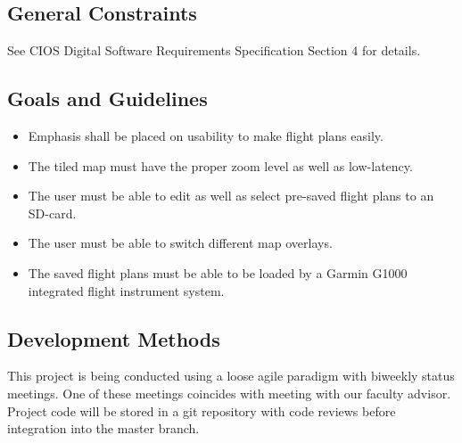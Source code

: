 \documentclass[12pt, letterpaper]{article}
\begin{document}
  \subsection{General Constraints}
    See CIOS Digital Software Requirements Specification Section 4 for details.
  \subsection{Goals and Guidelines}
    \begin{itemize}
      \setlength{\itemsep}{1pt}
      \setlength{\parskip}{0pt}
      \setlength{\parsep}{0pt}
      \item Emphasis shall be placed on usability to make flight plans easily.
      \item The tiled map must have the proper zoom level as well as low-latency.
      \item The user must be able to edit as well as select pre-saved flight plans to an SD-card.
      \item The user must be able to switch different map overlays.
      \item The saved flight plans must be able to be loaded by a Garmin G1000 integrated flight instrument system.
    \end{itemize}
  \subsection{Development Methods}
    This project is being conducted using a loose agile paradigm with biweekly status meetings.
    One of these meetings coincides with meeting with our faculty advisor.
    Project code will be stored in a git repository with code reviews before integration into the master branch.

\newpage
\end{document}
